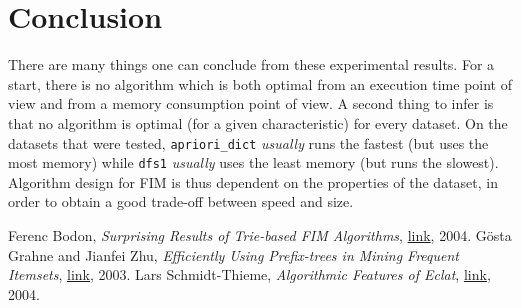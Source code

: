 \documentclass[journal, 9pt]{IEEEtran}
\theoremstyle{definition}
\newcommand{\py}[1]{\texttt{#1}}
\begin{document}
\section*{Conclusion}
There are many things one can conclude from these experimental results.
For a start, there is no algorithm which is both optimal from an execution time point of view and from a memory consumption point of view.
A second thing to infer is that no algorithm is optimal (for a given characteristic) for every dataset.
On the datasets that were tested, \py{apriori_dict} \textit{usually} runs the fastest (but uses the most memory) while \py{dfs1} \textit{usually} uses the least memory (but runs the slowest).
Algorithm design for FIM is thus dependent on the properties of the dataset, in order to obtain a good trade-off between speed and size.

\begin{thebibliography}{9}
	Ferenc Bodon, \textit{Surprising Results of Trie-based FIM Algorithms}, \href{http://sunsite.informatik.rwth-aachen.de/Publications/CEUR-WS/Vol-126/bodon.pdf}{link}, 2004.
	Gösta Grahne and Jianfei Zhu, \textit{Efficiently Using Prefix-trees in Mining Frequent Itemsets}, \href{http://ceur-ws.org/Vol-90/grahne.pdf}{link}, 2003.
	Lars Schmidt-Thieme, \textit{Algorithmic Features of Eclat}, \href{http://sunsite.informatik.rwth-aachen.de/Publications/CEUR-WS/Vol-126/schmidtthieme.pdf}{link}, 2004.
\end{thebibliography}
\end{document}
